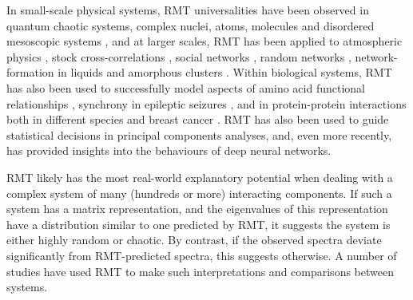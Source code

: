 \documentclass[12pt]{spieman}  %
\begin{document}
\begin{spacing}{2}
In small-scale physical systems, RMT universalities have been observed in
quantum chaotic systems, complex nuclei, atoms, molecules and disordered
mesoscopic systems
\cite{guhrRandommatrixTheoriesQuantum1998a,mehtaRandomMatrices2004,brodyRandommatrixPhysicsSpectrum1981,beenakkerRandommatrixTheoryQuantum1997,bohigasHigherOrderCorrelationsSpectra1985,wintgenLevelStatisticsQuantized1988,pandeySkewOrthogonalPolynomialsUniversality2001},
and at larger scales, RMT has been applied to atmospheric physics
\cite{santhanamStatisticsAtmosphericCorrelations2001}, stock cross-correlations
\cite{plerouRandomMatrixApproach2002} , social networks
\cite{jalanUncoveringRandomnessSuccess2014}, random networks
\cite{bandyopadhyayUniversalityComplexNetworks2007}, network-formation in
liquids
\cite{sastrySpectralStatisticsInstantaneous2001,matharooSpectralStatisticsQuenched2009}
and amorphous clusters
\cite{sarkarUniversalityVibrationalSpectra2004,matharooVibrationalSpectraAmorphous2005,matharooUniversalityVibrationalSpectra2008}.
Within biological systems, RMT has also been used to successfully model aspects
of  amino acid functional relationships
\cite{bhadolaTargetingFunctionalMotifs2016}, synchrony in epileptic seizures
\cite{osorioPhasesynchronizationRandommatrixBased2011}, and in protein-protein
interactions both in different species
\cite{agrawalQuantifyingRandomnessProtein2014} and breast cancer
\cite{raiRandomnessPreservedPatterns2015}. RMT has also been used to guide
statistical decisions in principal components
analyses\cite{franklinParallelAnalysisMethod1995,
veraartDenoisingDiffusionMRI2016, ulfarssonDimensionEstimationNoisy2008}, and,
even more recently, has provided insights into the behaviours of deep
neural networks\cite{martinImplicitSelfRegularizationDeep2021,
martinPredictingTrendsQuality2021}.

RMT likely has the most real-world explanatory potential when dealing with a
complex system of many (hundreds or more\cite{mehtaRandomMatrices2004})
interacting components. If such a system has a matrix representation, and the
eigenvalues of this representation have a distribution similar to one predicted
by RMT, it suggests the system is either highly random or chaotic. By contrast,
if the observed spectra deviate significantly from RMT-predicted spectra, this
suggests otherwise. A number of studies have used RMT to make such
interpretations and comparisons between
systems\cite{santhanamStatisticsAtmosphericCorrelations2001,
jalanUncoveringRandomnessSuccess2014,
bandyopadhyayUniversalityComplexNetworks2007,
agrawalQuantifyingRandomnessProtein2014, raiRandomnessPreservedPatterns2015,
sebaRandomMatrixAnalysis2003, wangSpectralPropertiesTemporal2015,
wangRandomMatrixTheory2016, matharooSpontaneousBackpainAlters2020}.


\end{spacing}
\end{document}
